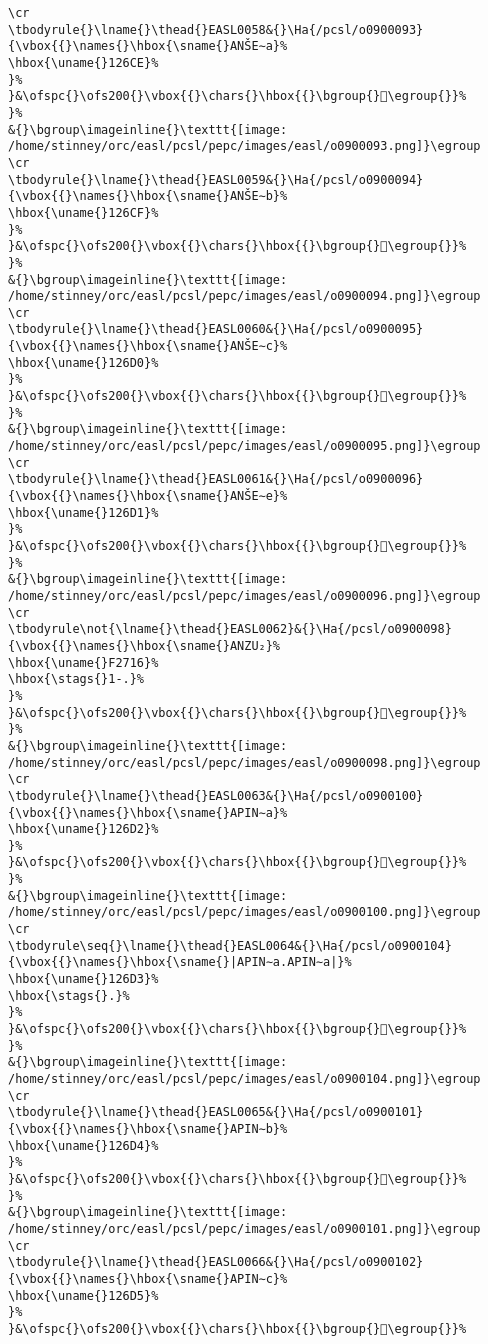 \begin{verbatim}
\cr
\tbodyrule{}\lname{}\thead{}EASL0058&{}\Ha{/pcsl/o0900093}{\vbox{{}\names{}\hbox{\sname{}ANŠE∼a}%
\hbox{\uname{}126CE}%
}%
}&\ofspc{}\ofs200{}\vbox{{}\chars{}\hbox{{}\bgroup{}𒛎\egroup{}}%
}%
&{}\bgroup\imageinline{}\texttt{[image: /home/stinney/orc/easl/pcsl/pepc/images/easl/o0900093.png]}\egroup
\cr
\tbodyrule{}\lname{}\thead{}EASL0059&{}\Ha{/pcsl/o0900094}{\vbox{{}\names{}\hbox{\sname{}ANŠE∼b}%
\hbox{\uname{}126CF}%
}%
}&\ofspc{}\ofs200{}\vbox{{}\chars{}\hbox{{}\bgroup{}𒛏\egroup{}}%
}%
&{}\bgroup\imageinline{}\texttt{[image: /home/stinney/orc/easl/pcsl/pepc/images/easl/o0900094.png]}\egroup
\cr
\tbodyrule{}\lname{}\thead{}EASL0060&{}\Ha{/pcsl/o0900095}{\vbox{{}\names{}\hbox{\sname{}ANŠE∼c}%
\hbox{\uname{}126D0}%
}%
}&\ofspc{}\ofs200{}\vbox{{}\chars{}\hbox{{}\bgroup{}𒛐\egroup{}}%
}%
&{}\bgroup\imageinline{}\texttt{[image: /home/stinney/orc/easl/pcsl/pepc/images/easl/o0900095.png]}\egroup
\cr
\tbodyrule{}\lname{}\thead{}EASL0061&{}\Ha{/pcsl/o0900096}{\vbox{{}\names{}\hbox{\sname{}ANŠE∼e}%
\hbox{\uname{}126D1}%
}%
}&\ofspc{}\ofs200{}\vbox{{}\chars{}\hbox{{}\bgroup{}𒛑\egroup{}}%
}%
&{}\bgroup\imageinline{}\texttt{[image: /home/stinney/orc/easl/pcsl/pepc/images/easl/o0900096.png]}\egroup
\cr
\tbodyrule\not{\lname{}\thead{}EASL0062}&{}\Ha{/pcsl/o0900098}{\vbox{{}\names{}\hbox{\sname{}ANZU₂}%
\hbox{\uname{}F2716}%
\hbox{\stags{}1-.}%
}%
}&\ofspc{}\ofs200{}\vbox{{}\chars{}\hbox{{}\bgroup{}󲜖\egroup{}}%
}%
&{}\bgroup\imageinline{}\texttt{[image: /home/stinney/orc/easl/pcsl/pepc/images/easl/o0900098.png]}\egroup
\cr
\tbodyrule{}\lname{}\thead{}EASL0063&{}\Ha{/pcsl/o0900100}{\vbox{{}\names{}\hbox{\sname{}APIN∼a}%
\hbox{\uname{}126D2}%
}%
}&\ofspc{}\ofs200{}\vbox{{}\chars{}\hbox{{}\bgroup{}𒛒\egroup{}}%
}%
&{}\bgroup\imageinline{}\texttt{[image: /home/stinney/orc/easl/pcsl/pepc/images/easl/o0900100.png]}\egroup
\cr
\tbodyrule\seq{}\lname{}\thead{}EASL0064&{}\Ha{/pcsl/o0900104}{\vbox{{}\names{}\hbox{\sname{}|APIN∼a.APIN∼a|}%
\hbox{\uname{}126D3}%
\hbox{\stags{}.}%
}%
}&\ofspc{}\ofs200{}\vbox{{}\chars{}\hbox{{}\bgroup{}𒛓\egroup{}}%
}%
&{}\bgroup\imageinline{}\texttt{[image: /home/stinney/orc/easl/pcsl/pepc/images/easl/o0900104.png]}\egroup
\cr
\tbodyrule{}\lname{}\thead{}EASL0065&{}\Ha{/pcsl/o0900101}{\vbox{{}\names{}\hbox{\sname{}APIN∼b}%
\hbox{\uname{}126D4}%
}%
}&\ofspc{}\ofs200{}\vbox{{}\chars{}\hbox{{}\bgroup{}𒛔\egroup{}}%
}%
&{}\bgroup\imageinline{}\texttt{[image: /home/stinney/orc/easl/pcsl/pepc/images/easl/o0900101.png]}\egroup
\cr
\tbodyrule{}\lname{}\thead{}EASL0066&{}\Ha{/pcsl/o0900102}{\vbox{{}\names{}\hbox{\sname{}APIN∼c}%
\hbox{\uname{}126D5}%
}%
}&\ofspc{}\ofs200{}\vbox{{}\chars{}\hbox{{}\bgroup{}𒛕\egroup{}}%

\end{verbatim}
